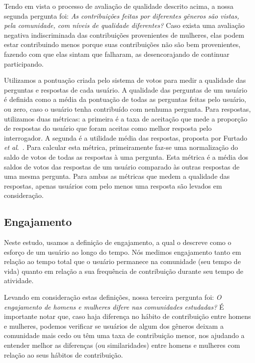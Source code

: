 Tendo em vista o processo de avaliação de qualidade descrito acima, a nossa segunda pergunta foi: \textit{As contribuições feitas por diferentes gêneros são vistas, pela comunidade, com níveis de qualidade diferentes?} Caso exista uma avaliação negativa indiscriminada das contribuições provenientes de mulheres, elas podem estar contribuindo menos porque suas contribuições não são bem provenientes, fazendo com que elas sintam que falharam, as desencorajando de continuar participando. 

Utilizamos a pontuação criada pelo sistema de votos para medir a qualidade das perguntas e respostas de cada usuário. A qualidade das perguntas de um usuário é definida como a média da pontuação de todas as perguntas feitas pelo usuário, ou zero, caso o usuário tenha contribuído com nenhuma pergunta. Para respostas, utilizamos duas métricas: a primeira é a taxa de aceitação que mede a proporção de respostas do usuário que foram aceitas como melhor resposta pelo interrogador. A segunda é a utilidade média das respostas, proposta por Furtado \textit{et al}.~\cite{furtado2013contributor}. Para calcular esta métrica, primeiramente faz-se uma normalização do saldo de votos de todas as respostas à uma pergunta. Esta métrica é a média dos saldos de votos das respostas de um usuário comparado às outras respostas de uma mesma pergunta. Para ambas as métricas que medem a qualidade das respostas, apenas usuários com pelo menos uma resposta são levados em consideração.

\subsection{Engajamento}

Neste estudo, usamos a definição de engajamento, a qual o descreve como o esforço de um usuário ao longo do tempo. Nós medimos engajamento tanto em relação ao tempo total que o usuário permanece na comunidade (seu tempo de vida) quanto em relação a sua frequência de contribuição durante seu tempo de atividade.

Levando em consideração estas definições, nossa terceira pergunta foi: \textit{O engajamento de homens e mulheres difere nas comunidades estudadas?} É importante notar que, caso haja diferença no hábito de contribuição entre homens e mulheres, podemos verificar se usuários de algum dos gêneros deixam a comunidade mais cedo ou têm uma taxa de contribuição menor, nos ajudando a entender melhor as diferenças (ou similaridades) entre homens e mulheres com relação ao seus hábitos de contribuição.

